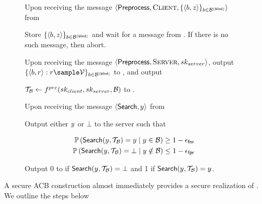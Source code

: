 \begin{figure}
\begin{mdframed}
\enumListEnd
\item Upon receiving the message $\langle \preprocess, \client, \{\langle \genericBlocklistElmt, \genericCInputElmtPRFEval \rangle\}_{\genericBlocklistElmt \in \blindedBlocklist} \rangle$ from \client
\enumListStart
\item Store $\{\langle \genericBlocklistElmt, \genericCInputElmtPRFEval \rangle\}_{\genericBlocklistElmt \in \blindedBlocklist}$ and wait for a \preprocess message from \server. If there is no such message, then abort. 
\item Upon receiving the message $\langle \mathsf{Preprocess}, \textsc{Server}, sk_{server} \rangle$, output 
$\{\langle \genericBlocklistElmt, \genericRand \rangle: \genericRand \sample \preprocessOutputSpace\}_{\genericBlocklistElmt \in \blindedBlocklist}$ to \server, and output $ $
 
$\blklistToken \assign \preprocessFn(\clientSecretKey, \serverSecretKey, \blocklist)$ to \client. 
\enumListEnd
\item Upon receiving the message $\langle \searchBlocklist, \genericCInputElmt \rangle$ from \client

\enumListStart
\item Output either $\genericCInputElmt$  or $\bot$ to the server such that  


\begin{align}
\cprob{}{\searchBlocklist(\genericCInputElmt, \blklistToken) = \genericCInputElmt}{\genericCInputElmt \in \blocklist} \ge 1 - \fnr\\
\cprob{}{\searchBlocklist(\genericCInputElmt, \blklistToken) = \bot}{\genericCInputElmt \notin \blocklist} \le 1 - \fpr 
\end{align}

\item Output $0$ to \client if $\searchBlocklist(\genericCInputElmt, \blklistToken) = \bot$ and 1 if $\searchBlocklist(\genericCInputElmt, \blklistToken) = \genericCInputElmt$. 

\enumListEnd
\itemListEnd
\end{mdframed}
\end{figure}

\fi 




%
A secure ACB construction almost immediately provides a secure realization of \contentModFuncExact. We outline the steps below

